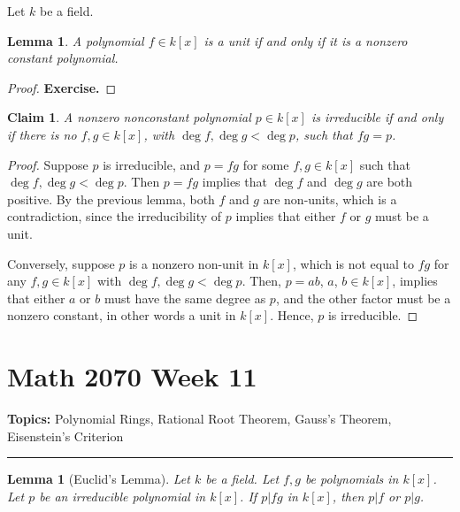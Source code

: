 \documentclass[a4paper,12pt]{report}
\newcounter{statement}
\numberwithin{statement}{chapter}
\newtheorem{lemma}[statement]{Lemma}
\newtheorem{claim}[statement]{Claim}
\numberwithin{equation}{chapter}
\numberwithin{section}{chapter}
\numberwithin{subsection}{section}
\begin{document}
Let $k$ be a field.
\begin{lemma}
A polynomial $f \in k[x]$ is a unit if and only if it is a
nonzero constant polynomial.
\end{lemma}
\begin{proof}
 {\bf Exercise.} 
\end{proof}







\begin{claim}
A nonzero nonconstant polynomial $p \in k[x]$ is irreducible if and only if there is no $f, g \in k[x]$,
with $\deg f, \deg g < \deg p$, such that $fg = p$.
\end{claim}
\begin{proof}

Suppose $p$ is irreducible, and $p = fg$ for some $f, g \in k[x]$ such that $\deg f, \deg g < \deg p$.  Then $p = fg$ implies that $\deg f$ and $\deg g$ are both positive.
By the previous lemma, both $f$ and $g$ are non-units, which is a contradiction,
since the irreducibility of $p$ implies that either $f$ or $g$ must be a unit.


Conversely, suppose $p$ is a nonzero non-unit in $k[x]$,
which is not equal to $fg$ for any $f, g \in k[x]$ with $\deg f, \deg g < \deg p$.
Then, $p = ab$, $a$, $b \in k[x]$,
implies that either $a$ or $b$ must have the same degree as $p$,
and the other factor must be a nonzero constant, in other words a unit in $k[x]$.
Hence, $p$ is irreducible.


\end{proof}
\setcounter{chapter}{11}\setcounter{section}{0}
\setcounter{subsection}{0}
\setcounter{statement}{0}

\chapter*{Math 2070 Week 11}
{\bf Topics: }Polynomial Rings, Rational Root Theorem, Gauss's Theorem, Eisenstein's Criterion
\hrule






\begin{lemma}[Euclid's Lemma]


Let $k$ be a field.
Let $f, g$ be polynomials in $k[x]$.
Let $p$ be an irreducible polynomial in $k[x]$.
If $p | fg$ in $k[x]$, then $p | f$ or $p | g$.
\end{lemma}
\end{document}
